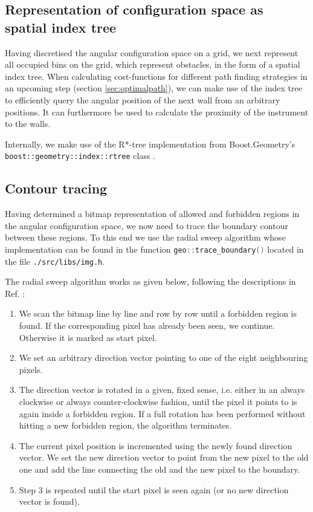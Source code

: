 \subsection{Representation of configuration space as spatial index tree}
\label{sec:walls_index_tree}
Having discretised the angular configuration space on a grid, we next represent all occupied bins
on the grid, which represent obstacles, in the form of a spatial index tree.
When calculating cost-functions for different path finding strategies in an upcoming step 
(section \ref{sec:optimalpath}), we can make use of the index tree to efficiently query
the angular position of the next wall from an arbitrary positions. 
It can furthermore be used to calculate the proximity of the instrument to the walls.

Internally, we make use of the R*-tree implementation from Boost.Geometry's \cite{web_boost_geometry} 
\lstinline[language=C++]|boost::geometry::index::rtree| class \cite{web_boost_geometry_rtree}.




\subsection{Contour tracing}
\label{sec:contourtracing}
Having determined a bitmap representation of allowed and forbidden regions in the angular configuration space,
we now need to trace the boundary contour between these regions.
To this end we use the radial sweep algorithm \cite{web_radial_sweep} whose implementation can be found
in the function \lstinline[language=C++]|geo::trace_boundary()| located in the file \lstinline|./src/libs/img.h|.

The radial sweep algorithm works as given below, following the descriptions in Ref. \cite{web_radial_sweep}:
\begin{enumerate}
	\item We scan the bitmap line by line and row by row until a forbidden region is found. 
		If the corresponding pixel has already been seen, we continue. Otherwise it is marked as start pixel.
	\item We set an arbitrary direction vector pointing to one of the eight neighbouring pixels.
	\item The direction vector is rotated in a given, fixed sense, i.e. either in an always clockwise or 
		always counter-clockwise fashion, until the pixel it points to is again inside a forbidden region.
		If a full rotation has been performed without hitting a new forbidden region, the algorithm terminates.
	\item The current pixel position is incremented using the newly found direction vector. 
		We set the new direction vector to point from the new pixel to the old one and
		add the line connecting the old and the new pixel to the boundary.
	\item Step 3 is repeated until the start pixel is seen again (or no new direction vector is found).
\end{enumerate}



